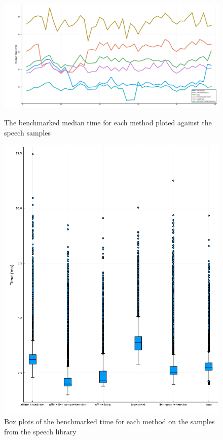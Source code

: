 \documentclass[
  american,
]{article}
\begin{document}
\begin{figure}[H]
    \begin{minipage}{.6\linewidth}
    \centering
    \includegraphics[width=\textwidth]{img/benchmark_median_time.png}
    \caption{The benchmarked median time for each method ploted against the speech samples}
    \label{fig:benchmark_median_time}
    \end{minipage}%
    \hfill
    \begin{minipage}{.35\linewidth}
    \centering
    \includegraphics[width=\textwidth]{img/benchmark_time_boxplot.png}
    \caption{Box plots of the benchmarked time for each method on the samples from the speech library}
    \end{minipage}
\end{figure}
\end{document}
